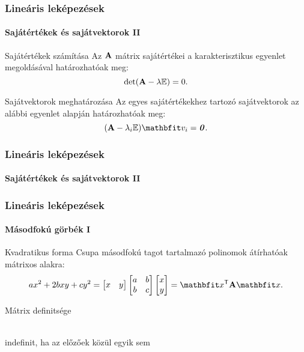 \begin{frame}
  \frametitle{Lineáris leképezések}
  \framesubtitle{Sajátértékek és sajátvektorok II}

  \begin{block}{Sajátértékek számítása}
    Az $\mathbf{A}$ mátrix sajátértékei a karakterisztikus egyenlet megoldásával
    határozhatóak meg:
    \[
      \det (\mathbf{A} - \lambda {\mathbb{E}}) = 0
      \text.
    \]
  \end{block}

  \begin{block}{Sajátvektorok meghatározása}
    Az egyes sajátértékekhez tartozó sajátvektorok az alábbi egyenlet alapján
    határozhatóak meg:
    \[
      (\rmat A - \lambda_i \imat) \rvec v_i = \nvec
      \text.
    \]
  \end{block}
\end{frame}

\begin{frame}
  \frametitle{Lineáris leképezések}
  \framesubtitle{Sajátértékek és sajátvektorok II}

  
  
\end{frame}

\begin{frame}
  \frametitle{Lineáris leképezések}
  \framesubtitle{Másodfokú görbék I}

  \begin{block}{Kvadratikus forma}
    Csupa másodfokú tagot tartalmazó polinomok átírhatóak mátrixos alakra:
    \[
      a x^2 + 2 b x y + c y^2
      =
      \begin{bmatrix} x & y \end{bmatrix}
      \begin{bmatrix} a & b \\ b & c \end{bmatrix}
      \begin{bmatrix} x \\ y \end{bmatrix}
      =
      \rvec x^{\mathsf T} \rmat A \rvec x
      \text.
    \]
  \end{block}

  \begin{block}{Mátrix definitsége}
    \centering
    \\[2mm]
    indefinit, ha az előzőek közül egyik sem
  \end{block}
\end{frame}

